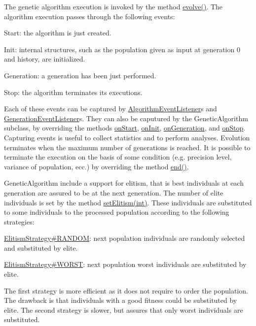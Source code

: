 The genetic algorithm execution is invoked by the method \hyperlink{classjenes_1_1_genetic_algorithm_3_01_t_01extends_01_chromosome_01_4_a8afdd855dc891b981cbf675c63db72c3}{evolve()}. The algorithm execution passes through the following events\-: 
\begin{DoxyItemize}
\item Start\-: the algorithm is just created. 
\item Init\-: internal structures, such as the population given as input at generation 0 and history, are initialized. 
\item Generation\-: a generation has been just performed. 
\item Stop\-: the algorithm terminates its executions. 
\end{DoxyItemize}Each of these events can be captured by \hyperlink{}{Algorithm\-Event\-Listener}s and \hyperlink{}{Generation\-Event\-Listener}s. They can also be caputured by the {\ttfamily Genetic\-Algorithm} subclass, by overriding the methods \hyperlink{classjenes_1_1_genetic_algorithm_3_01_t_01extends_01_chromosome_01_4_a0ed4a97cf7e3266913eaad8092913de3}{on\-Start}, \hyperlink{classjenes_1_1_genetic_algorithm_3_01_t_01extends_01_chromosome_01_4_a85479397ce0f8bd995b97fa91f4d6690}{on\-Init}, \hyperlink{classjenes_1_1_genetic_algorithm_3_01_t_01extends_01_chromosome_01_4_aed0d630f1e0b290bb87ba9ab8b164b89}{on\-Generation}, and \hyperlink{classjenes_1_1_genetic_algorithm_3_01_t_01extends_01_chromosome_01_4_a04258af6f64ec98561b015651d20f9ea}{on\-Stop}. Capturing events is useful to collect statistics and to perform analyses. Evolution terminates when the maximum number of generations is reached. It is possible to terminate the execution on the basis of some condition (e.\-g. precision level, variance of population, ecc.) by overriding the method \hyperlink{classjenes_1_1_genetic_algorithm_3_01_t_01extends_01_chromosome_01_4_a41376d72c82d4503693eebb3832cf772}{end()}. 

{\ttfamily Genetic\-Algorithm} include a support for elitism, that is best individuals at each generation are assured to be at the next generation. The number of elite individuals is set by the method \hyperlink{}{set\-Elitism(int)}. These individuals are substituted to some individuals to the processed population according to the following strategies\-: 
\begin{DoxyItemize}
\item \hyperlink{enumjenes_1_1_genetic_algorithm_3_01_t_01extends_01_chromosome_01_4_1_1_elitism_strategy_a591ab5eac2a1d3f09f99ab362ee54f65}{Elitism\-Strategy\#\-R\-A\-N\-D\-O\-M}\-: next population individuals are randomly selected and substituted by elite. 
\item \hyperlink{enumjenes_1_1_genetic_algorithm_3_01_t_01extends_01_chromosome_01_4_1_1_elitism_strategy_a60c1acf7a272aca7e29b422a124a2ee2}{Elitism\-Strategy\#\-W\-O\-R\-S\-T}\-: next population worst individuals are substituted by elite. 
\end{DoxyItemize}The first strategy is more efficient as it does not require to order the population. The drawback is that individuals with a good fitness could be substituted by elite. The second strategy is slower, but assures that only worst individuals are substituted. 

